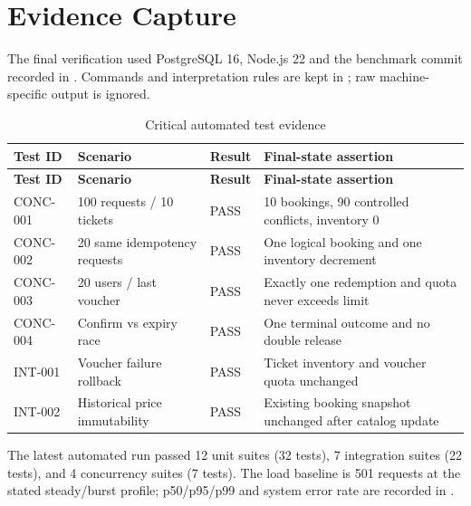 \section{Evidence Capture}
The final verification used PostgreSQL 16, Node.js 22 and the benchmark commit
recorded in . Commands and interpretation
rules are kept in ; raw machine-specific output is
ignored.

\begin{longtable}{p{}p{}p{}p{}}
\caption{Critical automated test evidence}\label{tab:test-evidence}\\
\toprule
\textbf{Test ID} & \textbf{Scenario} & \textbf{Result} & \textbf{Final-state assertion} \\
\midrule
\endfirsthead
\toprule
\textbf{Test ID} & \textbf{Scenario} & \textbf{Result} & \textbf{Final-state assertion} \\
\midrule
\endhead
CONC-001 & 100 requests / 10 tickets & PASS & 10 bookings, 90 controlled conflicts, inventory 0 \\
CONC-002 & 20 same idempotency requests & PASS & One logical booking and one inventory decrement \\
CONC-003 & 20 users / last voucher & PASS & Exactly one redemption and quota never exceeds limit \\
CONC-004 & Confirm vs expiry race & PASS & One terminal outcome and no double release \\
INT-001 & Voucher failure rollback & PASS & Ticket inventory and voucher quota unchanged \\
INT-002 & Historical price immutability & PASS & Existing booking snapshot unchanged after catalog update \\
\bottomrule
\end{longtable}

The latest automated run passed 12 unit suites (32 tests), 7 integration suites
(22 tests), and 4 concurrency suites (7 tests). The load baseline is 501
requests at the stated steady/burst profile; p50/p95/p99 and system error rate
are recorded in .
